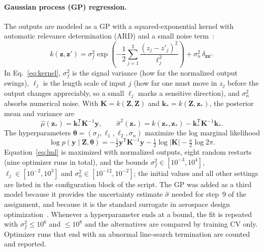 \paragraph{Gaussian process (GP) regression.}\label{sec:gp_method} The outputs are modeled as a GP with a squared-exponential kernel with automatic relevance determination (ARD) and a small noise term~\cite{rasmussen2006}:
\begin{equation}
  k(\mathbf{z},\mathbf{z}')=\sigma_f^2\exp\!\left(-\frac12\sum_{j=1}^{2}\frac{(z_j-z'_j)^2}{\ell_j^2}\right)+\sigma_n^2\,\delta_{\mathbf{z}\mathbf{z}'} .
  \label{eq:kernel}
\end{equation}
In Eq.~\eqref{eq:kernel}, $\sigma_f^2$ is the signal variance (how far the normalized output swings), $\ell_j$ is the length scale of input $j$ (how far one must move in $z_j$ before the output changes appreciably, so a small $\ell_j$ marks a sensitive direction), and $\sigma_n^2$ absorbs numerical noise. With $\mathbf{K}=k(\mathbf{Z},\mathbf{Z})$ and $\mathbf{k}_*=k(\mathbf{Z},\mathbf{z}_*)$, the posterior mean and variance are
\begin{equation}
  \hat\mu(\mathbf{z}_*)=\mathbf{k}_*^{\mathsf T}\mathbf{K}^{-1}\mathbf{y},\qquad
  \hat\sigma^2(\mathbf{z}_*)=k(\mathbf{z}_*,\mathbf{z}_*)-\mathbf{k}_*^{\mathsf T}\mathbf{K}^{-1}\mathbf{k}_* .
  \label{eq:gp}
\end{equation}
The hyperparameters $\boldsymbol{\theta}=(\sigma_f,\ell_1,\ell_2,\sigma_n)$ maximize the log marginal likelihood
\begin{equation}
  \log p(\mathbf{y}\mid\mathbf{Z},\boldsymbol{\theta})=-\tfrac12\mathbf{y}^{\mathsf T}\mathbf{K}^{-1}\mathbf{y}-\tfrac12\log|\mathbf{K}|-\tfrac{n}{2}\log2\pi .
  \label{eq:lml}
\end{equation}
Equation~\eqref{eq:lml} is maximized with normalized outputs, eight random restarts (nine optimizer runs in total), and the bounds $\sigma_f^2\in[10^{-3},10^4]$, $\ell_j\in[10^{-2},10^3]$ and $\sigma_n^2\in[10^{-12},10^{-2}]$; the initial values and all other settings are listed in the configuration block of the script. The GP was added as a third model because it provides the uncertainty estimate $\hat\sigma$ needed for step~9 of the assignment, and because it is the standard surrogate in aerospace design optimization~\cite{forrester2008,jones1998}. Whenever a hyperparameter ends at a bound, the fit is repeated with $\sigma_f^2\le10^6$ and $\le10^8$ and the alternatives are compared by training CV only. Optimizer runs that end with an abnormal line-search termination are counted and reported.

